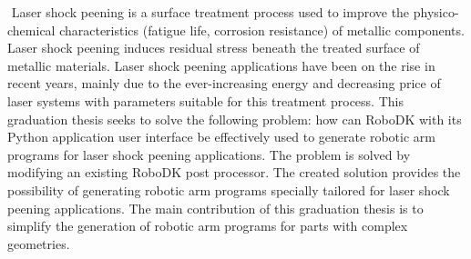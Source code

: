 ﻿%
﻿
Laser shock peening is a surface treatment process used to improve the physico-chemical characteristics (fatigue life, corrosion resistance) of metallic components. Laser shock peening induces residual stress beneath the treated surface of metallic materials. Laser shock peening applications have been on the rise in recent years, mainly due to the ever-increasing energy and decreasing price  of laser systems with parameters suitable for this treatment process. This graduation thesis seeks to solve the following problem: how can RoboDK with its Python application user interface be effectively used to generate robotic arm programs for laser shock peening applications. The problem is solved by modifying an existing RoboDK post processor. The created solution provides the possibility of generating robotic arm programs specially tailored for laser shock peening applications.  The main contribution of this graduation thesis is to simplify the generation of robotic arm programs for parts with complex geometries.


